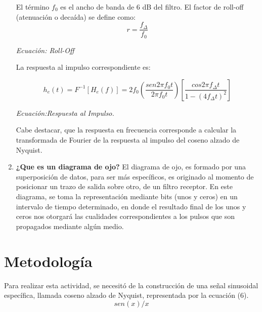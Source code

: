 \documentclass[lettersize,journal]{IEEEtran}
\begin{document}
\begin{enumerate}
El término $f_{0}$ es el ancho de banda de 6 dB del filtro. El factor de roll-off (atenuación o decaída) se define como:
\begin{equation}
    r = \frac{f_{\Delta}}{f_{0}}
\end{equation}
\begin{center}
    \textit{Ecuación: Roll-Off}
\end{center}

La respuesta al impulso correspondiente es:

\begin{equation}
    h_{e}(t)=F^{-1}[H_{e}(f)]=2f_{0}(\frac{sen2\pi f_{0}t}{2\pi f_{0}t})[\frac{cos2\pi f_{\Delta}t}{1-(4 f_{\Delta}t)^2}]
\end{equation}
\begin{center}
    \textit{Ecuación:Respuesta al Impulso. }
\end{center}

Cabe destacar, que la respuesta en frecuencia corresponde a calcular la transformada de Fourier de la respuesta al impulso del coseno alzado de Nyquist. 
\newline
    \item \textbf{¿Que es un diagrama de ojo?} \newline \newline
       El diagrama de ojo, es formado por una superposición de datos, para ser más específicos, es originado al momento de posicionar un trazo de salida sobre otro,  de un filtro receptor. En este diagrama, se toma la representación mediante bits (unos y ceros) en un intervalo de tiempo determinado, en donde el resultado final de los unos y ceros nos otorgará las cualidades correspondientes a los pulsos que son propagados mediante algún medio.
\end{enumerate}

\section{Metodología}\label{sec:metodologia} 
Para realizar esta actividad, se necesitó de la construcción de una señal sinusoidal específica, llamada coseno alzado de Nyquist, representada por la ecuación (6). \newline
\begin{equation} sen(x)/x\end{equation} 
\end{document}
